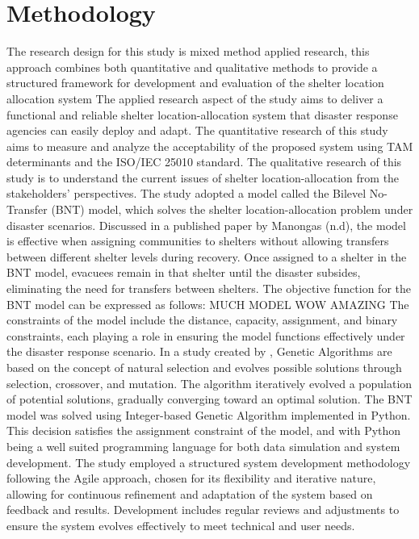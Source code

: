 \documentclass[12pt,a4paper,]{article}
\begin{document}
\section{Methodology}
	The research design for this study is mixed method applied research, this approach combines both quantitative and qualitative methods to provide a structured framework for development and evaluation of the shelter location allocation system
	The applied research aspect of the study aims to deliver a functional and reliable shelter location-allocation system that disaster response agencies can easily deploy and adapt. The quantitative research of this study aims to measure and analyze the acceptability of the proposed system using TAM determinants and the ISO/IEC 25010 standard. The qualitative research of this study is to understand the current issues of shelter location-allocation from the stakeholders’ perspectives.
	The study adopted a model called the Bilevel No-Transfer (BNT) model, which solves the shelter location-allocation problem under disaster scenarios. Discussed in a published paper by Manongas (n.d), the model is effective when assigning communities to shelters without allowing transfers between different shelter levels during recovery. Once assigned to a shelter in the BNT model, evacuees remain in that shelter until the disaster subsides, eliminating the need for transfers between shelters. The objective function for the BNT model can be expressed as follows:
	MUCH MODEL WOW AMAZING
	The constraints of the model include the distance, capacity, assignment, and binary constraints, each playing a role in ensuring the model functions effectively under the disaster response scenario. 
	In a study created by \textcite{Mathew2012}, Genetic Algorithms are based on the concept of natural selection and evolves possible solutions through selection, crossover, and mutation. The algorithm iteratively evolved a population of potential solutions, gradually converging toward an optimal solution.
	The BNT model was solved using Integer-based Genetic Algorithm implemented in Python. This decision satisfies the assignment constraint of the model, and with Python being a well suited programming language for both data simulation and system development.
	The study employed a structured system development methodology following the Agile approach, chosen for its flexibility and iterative nature, allowing for continuous refinement and adaptation of the system based on feedback and results. Development includes regular reviews and adjustments to ensure the system evolves effectively to meet technical and user needs.
\end{document}
